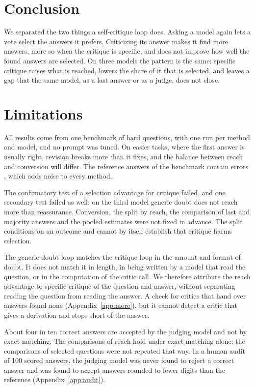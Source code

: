 \documentclass[11pt]{article}
\begin{document}
\section{Conclusion}

We separated the two things a self-critique loop does.
Asking a model again lets a vote select the answers it prefers.
Criticizing its answer makes it find more answers, more so when the critique is specific, and does not improve how well the found answers are selected.
On three models the pattern is the same: specific critique raises what is reached, lowers the share of it that is selected, and leaves a gap that the same model, as a last answer or as a judge, does not close.

\section*{Limitations}

All results come from one benchmark of hard questions, with one run per method and model, and no prompt was tuned.
On easier tasks, where the first answer is usually right, revision breaks more than it fixes, and the balance between reach and conversion will differ.
The reference answers of the benchmark contain errors \citep{zhai2026hleverified}, which adds noise to every method.

The confirmatory test of a selection advantage for critique failed, and one secondary test failed as well: on the third model generic doubt does not reach more than reassurance.
Conversion, the split by reach, the comparison of last and majority answers and the pooled estimates were not fixed in advance.
The split conditions on an outcome and cannot by itself establish that critique harms selection.

The generic-doubt loop matches the critique loop in the amount and format of doubt.
It does not match it in length, in being written by a model that read the question, or in the computation of the critic call.
We therefore attribute the reach advantage to specific critique of the question and answer, without separating reading the question from reading the answer.
A check for critics that hand over answers found none (Appendix~\ref{app:more}), but it cannot detect a critic that gives a derivation and stops short of the answer.

About four in ten correct answers are accepted by the judging model and not by exact matching.
The comparisons of reach hold under exact matching alone; the comparisons of selected questions were not repeated that way.
In a human audit of 100 scored answers, the judging model was never found to reject a correct answer and was found to accept answers rounded to fewer digits than the reference (Appendix~\ref{app:audit}).
\end{document}
